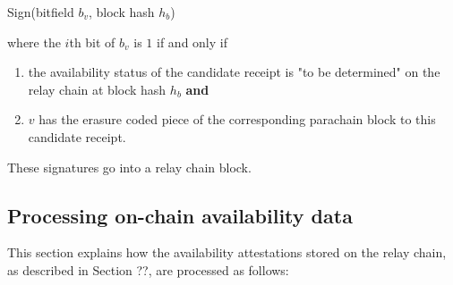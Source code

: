 Sign(bitfield $b_v$, block hash $h_b$)

where the $i$th bit of $b_v$ is $1$ if and only if

\begin{enumerate}
\item the availability status of the candidate receipt is "to be determined" on the relay chain at block hash $h_b$ \textbf{and}

\item $v$ has the erasure coded piece of the corresponding parachain block to this candidate receipt.
\end{enumerate}

These signatures go into a relay chain block.

\subsection{Processing on-chain availability data}
This section explains how the availability attestations stored on the relay chain, as described in Section ??, are processed as follows:

